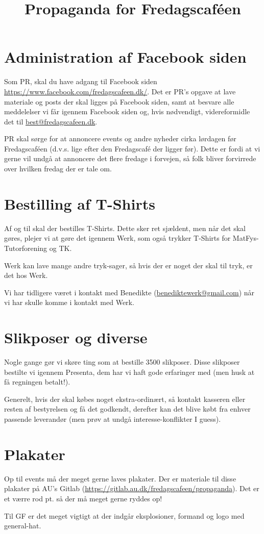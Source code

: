 

\title{Propaganda for Fredagscaféen}
\date{}



\maketitle

\section{Administration af Facebook siden}
Som PR, skal du have adgang til Facebook siden \url{https://www.facebook.com/fredagscafeen.dk/}. Det er PR's opgave at lave materiale og posts der skal ligges på Facebook siden, samt at besvare alle meddelelser vi får igennem Facebook siden og, hvis nødvendigt, videreformidle det til \url{best@fredagscafeen.dk}.

PR skal sørge for at annoncere events og andre nyheder cirka lørdagen før Fredagscaféen (d.v.s. lige efter den Fredagscafé der ligger før). Dette er fordi at vi gerne vil undgå at annoncere det flere fredage i forvejen, så folk bliver forvirrede over hvilken fredag der er tale om.

\section{Bestilling af T-Shirts}
Af og til skal der bestilles T-Shirts. Dette sker ret sjældent, men når det skal gøres, plejer vi at gøre det igennem Werk, som også trykker T-Shirts for MatFys-Tutorforening og TK.

Werk kan lave mange andre tryk-sager, så hvis der er noget der skal til tryk, er det hos Werk.

Vi har tidligere været i kontakt med Benedikte (\url{benediktewerk@gmail.com}) når vi har skulle komme i kontakt med Werk.

\section{Slikposer og diverse}
Nogle gange gør vi skøre ting som at bestille 3500 slikposer. Disse slikposer bestilte vi igennem Presenta, dem har vi haft gode erfaringer med (men husk at få regningen betalt!).

Generelt, hvis der skal købes noget ekstra-ordinært, så kontakt kasseren eller resten af bestyrelsen og få det godkendt, derefter kan det blive købt fra enhver passende leverandør (men prøv at undgå interesse-konflikter I guess).

\section{Plakater}
Op til events må der meget gerne laves plakater. Der er materiale til disse plakater på AU's Gitlab (\url{https://gitlab.au.dk/fredagscafeen/propaganda}). Det er et værre rod pt. så der må meget gerne ryddes op!

Til GF er det meget vigtigt at der indgår eksplosioner, formand og logo med general-hat.


